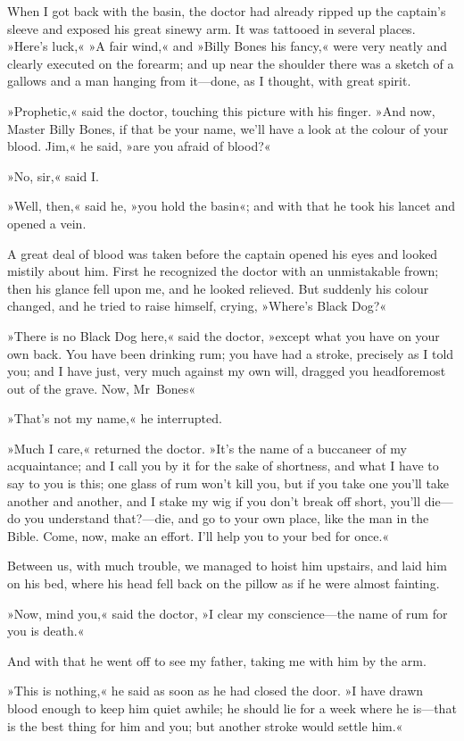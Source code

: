 When I got back with the basin, the doctor had already ripped up the captain's sleeve and exposed his great sinewy arm. It was tattooed in several places. »Here's luck,« »A fair wind,« and »Billy Bones his fancy,« were very neatly and clearly executed on the forearm; and up near the shoulder there was a sketch of a gallows and a man hanging from it—done, as I thought, with great spirit.

»Prophetic,« said the doctor, touching this picture with his finger. »And now, Master Billy Bones, if that be your name, we'll have a look at the colour of your blood. Jim,« he said, »are you afraid of blood?«

»No, sir,« said I.

»Well, then,« said he, »you hold the basin«; and with that he took his lancet and opened a vein.

A great deal of blood was taken before the captain opened his eyes and looked mistily about him. First he recognized the doctor with an unmistakable frown; then his glance fell upon me, and he looked relieved. But suddenly his colour changed, and he tried to raise himself, crying, »Where's Black Dog?«

»There is no Black Dog here,« said the doctor, »except what you have on your own back. You have been drinking rum; you have had a stroke, precisely as I told you; and I have just, very much against my own will, dragged you headforemost out of the grave. Now, Mr~Bones\longdash«

»That's not my name,« he interrupted.

»Much I care,« returned the doctor. »It's the name of a buccaneer of my acquaintance; and I call you by it for the sake of shortness, and what I have to say to you is this; one glass of rum won't kill you, but if you take one you'll take another and another, and I stake my wig if you don't break off short, you'll die—do you understand that?—die, and go to your own place, like the man in the Bible. Come, now, make an effort. I'll help you to your bed for once.«

Between us, with much trouble, we managed to hoist him upstairs, and laid him on his bed, where his head fell back on the pillow as if he were almost fainting.

»Now, mind you,« said the doctor, »I clear my conscience—the name of rum for you is death.«

And with that he went off to see my father, taking me with him by the arm.

»This is nothing,« he said as soon as he had closed the door. »I have drawn blood enough to keep him quiet awhile; he should lie for a week where he is—that is the best thing for him and you; but another stroke would settle him.«